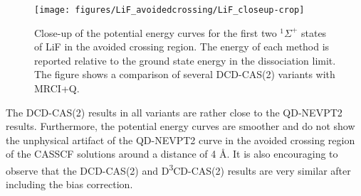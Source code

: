 \begin{figure}
\texttt{[image: figures/LiF\_avoidedcrossing/LiF\_closeup-crop]}
\caption[Close-up of the potential energy curves for the first two $^1\Sigma^+$ states of LiF in the avoided crossing region.]{Close-up of the potential energy curves for the first two $^1\Sigma^+$ states of LiF in the avoided crossing region. The energy of each method is reported relative to the ground state energy in the dissociation limit. The figure shows a comparison of several DCD-CAS(2) variants with MRCI+Q.}
\label{Fig:LiF_closeup}
\end{figure}
The DCD-CAS(2) results in all variants are rather close to the QD-NEVPT2 results. Furthermore, the potential energy curves are smoother and do not show the unphysical artifact of the QD-NEVPT2 curve in the avoided crossing region of the CASSCF solutions around a distance of 4 Å.
It is also encouraging to observe that the DCD-CAS(2) and D\textsuperscript{3}CD-CAS(2) results are very similar after including the bias correction.

